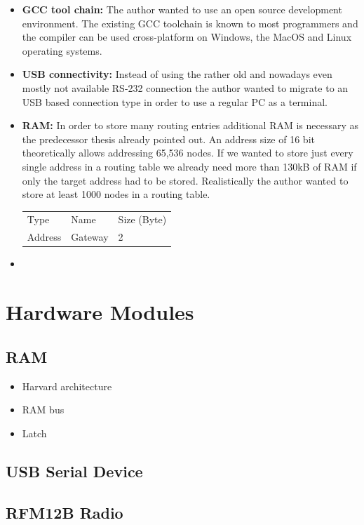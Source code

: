 \begin{itemize}
\item \textbf{GCC tool chain:} The author wanted to use an open source development environment. The existing GCC toolchain is known to most programmers and the compiler can be used cross-platform on Windows, the MacOS and Linux operating systems.
\item \textbf{USB connectivity:} Instead of using the rather old and nowadays even mostly not available RS-232 connection the author wanted to migrate to an USB based connection type in order to use a regular PC as a terminal.
\item \textbf{RAM:} In order to store many routing entries additional RAM is necessary as the predecessor thesis already pointed out. An address size of 16 bit theoretically allows addressing 65,536 nodes. If we wanted to store just every single address in a routing table we already need more than 130kB of RAM if only the target address had to be stored. Realistically the author wanted to store at least 1000 nodes in a routing table.

\begin{tabular}{lll}
Type & Name & Size (Byte) \\
Address & Gateway & 2 \\
\end{tabular}

\item \textbf{}
\end{itemize}

\section{Hardware Modules}
\subsection{RAM}
\begin{itemize}
\item Harvard architecture
\item RAM bus
\item Latch
\end{itemize}
\subsection{USB Serial Device}
\subsection{RFM12B Radio}
\label{sec:rfm12b}

